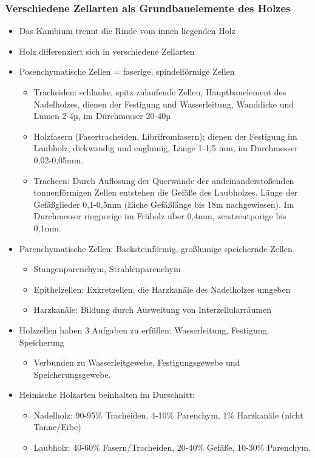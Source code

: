 \documentclass[12pt]{article}
\begin{document}
\subsubsection{Verschiedene Zellarten als Grundbauelemente des Holzes}
\begin{itemize}
  \item Das Kambium trennt die Rinde vom innen liegenden Holz 
  \item Holz differenziert sich in verschiedene Zellarten
  \item Posenchymatische Zellen = faserige, spindelförmige Zellen
  \begin{itemize}
    \item Tracheiden: schlanke, spitz zulaufende Zellen, Hauptbauelement des
          Nadelholzes, dienen der Festigung und Wasserleitung, Wanddicke und
          Lumen 2-4µ, im Durchmesser 20-40µ
     \item Holzfasern (Fasertracheiden, Librifromfasern): dienen der Festigung
           im Laubholz, dickwandig und englumig, Länge 1-1,5 mm, im Durchmesser
           0,02-0,05mm.
      \item Tracheen: Durch Auflösung der Querwände der andeinanderstoßenden
            tonnenförmigen Zellen entstehen die Gefäße des Laubholzes. Länge
            der Gefäßglieder 0,1-0,5mm (Eiche Gefäßlänge bis 18m
            nachgewiesen). Im Durchmesser ringporige im Früholz über 0,4mm,
            zerstreutporige bis 0,1mm.
  \end{itemize}
  \item Parenchymatische Zellen: Backsteinförmig, großlumige speichernde Zellen
  \begin{itemize}
    \item Stangenparenchym, Strahlenparenchym
    \item Epithelzellen: Exkretzellen, die Harzkanäle des Nadelholzes umgeben
    \item Harzkanäle: Bildung durch Ausweitung von Interzellularräumen
  \end {itemize}
  \item Holzzellen haben 3 Aufgaben zu erfüllen: Wasserleitung, Festigung,
        Speicherung
  \begin{itemize}
    \item Verbunden zu Wasserleitgewebe, Festigungsgewebe und Speicherungsgewebe.
  \end{itemize}
  \item Heimische Holzarten beinhalten im Durschnitt:
  \begin{itemize}
    \item Nadelholz: 90-95\% Tracheiden, 4-10\% Parenchym, 1\% Harzkanäle (nicht
    Tanne/Eibe)
    \item Laubholz: 40-60\% Fasern/Tracheiden, 20-40\% Gefäße, 10-30\%
    Parenchym.
    \end{itemize} 
\end{itemize}
  
\end{document}
